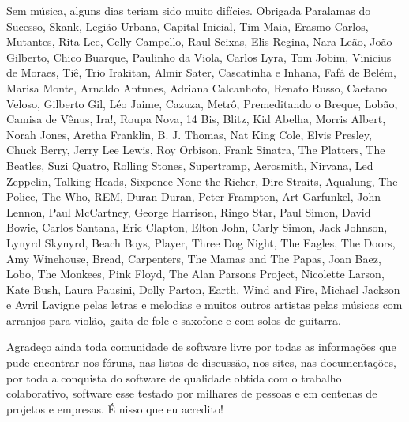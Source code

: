 Sem música, alguns dias teriam sido muito difícies. Obrigada Paralamas do Sucesso, Skank, Legião Urbana, Capital Inicial, Tim Maia, Erasmo Carlos, Mutantes, Rita Lee, Celly Campello, Raul Seixas, Elis Regina, Nara Leão, João Gilberto, Chico Buarque, Paulinho da Viola, Carlos Lyra, Tom Jobim, Vinicius de Moraes, Tiê, Trio Irakitan, Almir Sater, Cascatinha e Inhana, Fafá de Belém, Marisa Monte, Arnaldo Antunes,  Adriana Calcanhoto, Renato Russo, Caetano Veloso, Gilberto Gil, Léo Jaime, Cazuza, Metrô, Premeditando o Breque, Lobão, Camisa de Vênus, Ira!, Roupa Nova, 14 Bis, Blitz, Kid Abelha, Morris Albert, Norah Jones, Aretha Franklin, B. J. Thomas, Nat King Cole, Elvis Presley, Chuck Berry, Jerry Lee Lewis, Roy Orbison, Frank Sinatra, The Platters, The Beatles, Suzi Quatro, Rolling Stones, Supertramp, Aerosmith, Nirvana, Led Zeppelin, Talking Heads, Sixpence None the Richer, Dire Straits, Aqualung, The Police, The Who, REM, Duran Duran, Peter Frampton, Art Garfunkel, John Lennon, Paul McCartney, George Harrison, Ringo Star, Paul Simon, David Bowie, Carlos Santana, Eric Clapton, Elton John, Carly Simon, Jack Johnson, Lynyrd Skynyrd, Beach Boys, Player, Three Dog Night, The Eagles, The Doors, Amy Winehouse, Bread, Carpenters, The Mamas and The Papas, Joan Baez, Lobo, The Monkees, Pink Floyd, The Alan Parsons Project, Nicolette Larson, Kate Bush, Laura Pausini, Dolly Parton, Earth, Wind and Fire, Michael Jackson e Avril Lavigne pelas letras e melodias e muitos outros artistas pelas músicas com arranjos para violão, gaita de fole e saxofone e com solos de guitarra.

Agradeço ainda toda comunidade de software livre por todas as informações que pude encontrar nos fóruns, nas listas de discussão, nos sites, nas documentações, por toda a conquista do software de qualidade obtida com o trabalho colaborativo, software esse testado por milhares de pessoas e em centenas de projetos e empresas. É nisso que eu acredito!



